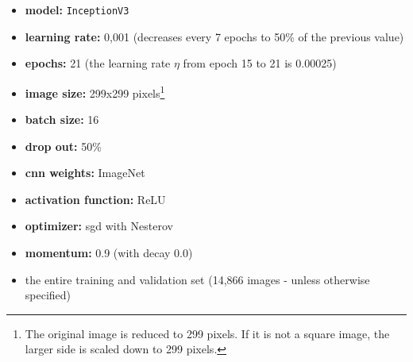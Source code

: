 \documentclass[10pt]{article}
\newif\ifen
\newif\ifde
\newcommand{\en}[1]{\ifen#1\fi}
\newcommand{\de}[1]{\ifde#1\fi}
\begin{document}
					\begin{itemize}
						\setlength\itemsep{0em}
						\item \textbf{model:} \texttt{InceptionV3}
						\item \textbf{learning rate:} 0,001 (decreases every 7 epochs to 50\% of the previous value)
						\item \textbf{epochs:} 21 (the learning rate \(\eta\) from epoch 15 to 21 is 0.00025)
						\item \textbf{image size:} 299x299 pixels\footnote{The original image is reduced to 299 pixels. If it is not a square image, the larger side is scaled down to 299 pixels.}
						\item \textbf{batch size:} 16
						\item \textbf{drop out:} 50\%
						\item \textbf{\ac{cnn} weights:} ImageNet
						\item \textbf{activation function:} ReLU
						\item \textbf{optimizer:} \ac{sgd} with Nesterov
						\item \textbf{momentum:} 0.9 (with decay 0.0)
						\item the entire training and validation set (14,866 images - unless otherwise specified)
					\end{itemize}
					
				\de{\noindent Verschiedene Modelle wurden im Kapitel ``\nameref{sec:section_validation_compare_cnn_models}'' mit den gleichen Parametern wie oben ausprobiert: \texttt{DenseNet121}, \texttt{DenseNet201}, \texttt{InceptionResNetV2}, \texttt{InceptionV3}, \texttt{NASNetLarge}, \texttt{ResNet50}, \texttt{VGG19} und \texttt{Xception}}
				\en{\noindent Different models were tried out in chapter ``\nameref{sec:section_validation_comparison_cnn_models}'' with the same parameters as above: \texttt{DenseNet121}, \texttt{DenseNet201}, \texttt{InceptionResNetV2}, \texttt{InceptionV3}, \texttt{NASNetLarge}, \texttt{ResNet50}, \texttt{VGG19} and \texttt{Xception}}

	\pagebreak
\end{document}
